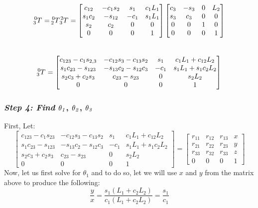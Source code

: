 \documentclass[10pt]{article}
\begin{document}
\[
\tensor*[^{0}_{3}]{T}{} = 
\tensor*[^{0}_{2}]{T}{} \tensor*[^{2}_{3}]{T}{} =
\begin{bmatrix}
    c_{12}       & -c_{1}s_{2}  & s_{1} & c_{1}L_{1}     \\
    s_{1}c_{2}   & -s_{12}      & -c_{1}& s_{1}L_{1}     \\
    s_{2}        & c_{2}        & 0     & 0      \\
    0            & 0            & 0     & 1
\end{bmatrix}
\begin{bmatrix}
    c_{3}        & -s_{3}       & 0     & L_{2}  \\
    s_{3}        & c_{3}        & 0     & 0      \\
    0            & 0            & 1     & 0      \\
    0            & 0            & 0     & 1
\end{bmatrix}
\]\\
\[
\tensor*[^{0}_{3}]{T}{} =
\begin{bmatrix}
c_{123}-c_{1}s_{2,3} & -c_{12}s_{3}-c_{13}s_{2}& s_{1} & c_{1}L_{1} + c_{12}L_{2}\\
s_{1}c_{23}-s_{123}    & -s_{13}c_{2}-s_{12}c_{3} & -c_{1}& s_{1}L_{1} + s_{1}c_{2}L_{2}\\
s_{2}c_{3}+c_{2}s_{3}  & c_{23}-s_{23}            & 0     & s_{2}L_{2}\\
0                      & 0                        & 0     & 1
\end{bmatrix}
\]
\subsubsection*{\textbf{\textit{Step 4: Find }}$\bf{\it{\theta_{1}}}$, $\bf{\it{\theta_{2}}}$, $\bf{\it{\theta_{3}}}$}
First, Let:
\[
\begin{bmatrix}
c_{123}-c_{1}s_{23} & -c_{12}s_{3}-c_{13}s_{2}& s_{1} & c_{1}L_{1} + c_{12}L_{2}\\
s_{1}c_{23}-s_{123}    & -s_{13}c_{2}-s_{12}c_{3} & -c_{1}& s_{1}L_{1} + s_{1}c_{2}L_{2}\\
s_{2}c_{3}+c_{2}s_{3}  & c_{23}-s_{23}            & 0     & s_{2}L_{2}\\
0                      & 0                        & 0     & 1
\end{bmatrix} = 
\begin{bmatrix}
r_{11} & r_{12} & r_{13} & x\\
r_{21} & r_{22} & r_{23} & y\\
r_{33} & r_{32} & r_{33} & z\\
0      & 0      & 0      & 1
\end{bmatrix}
\]
Now, let us first solve for $\theta_{1}$ and to do so, let we will use $x$ and $y$ from the matrix above to produce the following:
\[\dfrac{y}{x} = 
\dfrac{s_{1}(L_{1} + c_{2}L_{2})}{c_{1}(L_{1} + c_{2}L_{2})} =
\dfrac{s_{1}}{c_{1}}\]
\end{document}
